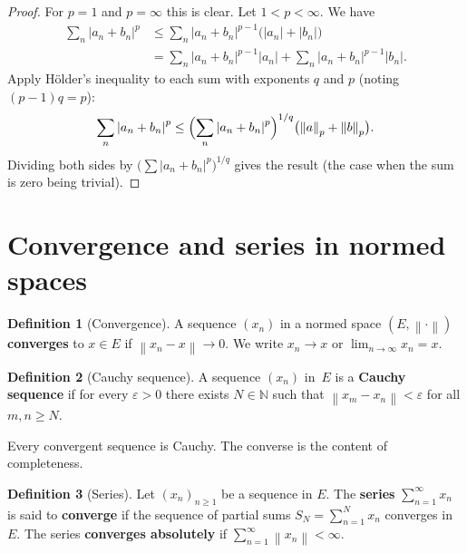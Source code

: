 \documentclass[a4paper,12pt]{book}
\newcommand{\N}{\mathbb{N}}
\newcommand{\norm}[1]{\left\| #1 \right\|}
\newcommand{\abs}[1]{\left| #1 \right|}
\theoremstyle{definition}
\newtheorem{definition}{Definition}[chapter]
\theoremstyle{plain}
\theoremstyle{remark}
\begin{document}
\begin{proof}
For $p=1$ and $p=\infty$ this is clear.  Let $1<p<\infty$.  We have
\begin{align*}
  \sum_n \abs{a_n+b_n}^p
  &\le \sum_n \abs{a_n+b_n}^{p-1}\bigl(\abs{a_n}+\abs{b_n}\bigr)\\
  &= \sum_n \abs{a_n+b_n}^{p-1}\abs{a_n}
    +\sum_n \abs{a_n+b_n}^{p-1}\abs{b_n}.
\end{align*}
Apply H\"older's inequality to each sum with exponents $q$ and $p$
(noting $(p-1)q=p$):
\[
  \sum_n\abs{a_n+b_n}^p
  \le \Bigl(\sum_n\abs{a_n+b_n}^p\Bigr)^{1/q}
      \bigl(\norm{a}_p+\norm{b}_p\bigr).
\]
Dividing both sides by $\bigl(\sum\abs{a_n+b_n}^p\bigr)^{1/q}$ gives the
result (the case when the sum is zero being trivial).
\end{proof}

\section{Convergence and series in normed spaces}
\label{sec:convergence-series}

\begin{definition}[Convergence]
\label{def:convergence}
A sequence $(x_n)$ in a normed space $(E,\norm{\cdot})$ \textbf{converges}
to $x\in E$ if $\norm{x_n - x}\to 0$.  We write $x_n\to x$ or
$\lim_{n\to\infty}x_n = x$.
\end{definition}

\begin{definition}[Cauchy sequence]
\label{def:cauchy}
A sequence $(x_n)$ in~$E$ is a \textbf{Cauchy sequence} if for every
$\varepsilon>0$ there exists $N\in\N$ such that $\norm{x_m-x_n}<\varepsilon$
for all $m,n\ge N$.
\end{definition}

Every convergent sequence is Cauchy.  The converse is the content of
completeness.

\begin{definition}[Series]
\label{def:series}
Let $(x_n)_{n\ge 1}$ be a sequence in $E$.  The \textbf{series}
$\sum_{n=1}^\infty x_n$ is said to \textbf{converge} if the sequence of
partial sums $S_N = \sum_{n=1}^N x_n$ converges in $E$.  The series
\textbf{converges absolutely} if
$\sum_{n=1}^\infty\norm{x_n} < \infty$.
\end{definition}
\end{document}
